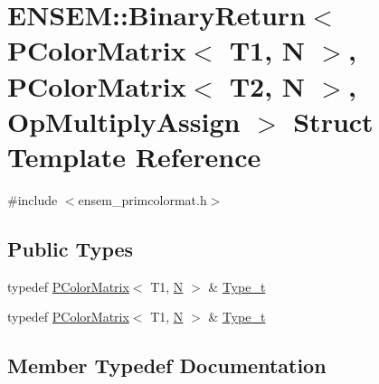 \hypertarget{structENSEM_1_1BinaryReturn_3_01PColorMatrix_3_01T1_00_01N_01_4_00_01PColorMatrix_3_01T2_00_01N_01_4_00_01OpMultiplyAssign_01_4}{}\section{E\+N\+S\+EM\+:\+:Binary\+Return$<$ P\+Color\+Matrix$<$ T1, N $>$, P\+Color\+Matrix$<$ T2, N $>$, Op\+Multiply\+Assign $>$ Struct Template Reference}
\label{structENSEM_1_1BinaryReturn_3_01PColorMatrix_3_01T1_00_01N_01_4_00_01PColorMatrix_3_01T2_00_01N_01_4_00_01OpMultiplyAssign_01_4}


{\ttfamily \#include $<$ensem\+\_\+primcolormat.\+h$>$}

\subsection*{Public Types}
\begin{DoxyCompactItemize}
\item 
typedef \mbox{\hyperlink{classENSEM_1_1PColorMatrix}{P\+Color\+Matrix}}$<$ T1, \mbox{\hyperlink{operator__name__util_8cc_a7722c8ecbb62d99aee7ce68b1752f337}{N}} $>$ \& \mbox{\hyperlink{structENSEM_1_1BinaryReturn_3_01PColorMatrix_3_01T1_00_01N_01_4_00_01PColorMatrix_3_01T2_00_01N_01_4_00_01OpMultiplyAssign_01_4_a4e651c3dec8d84b6018be3b261e51570}{Type\+\_\+t}}
\item 
typedef \mbox{\hyperlink{classENSEM_1_1PColorMatrix}{P\+Color\+Matrix}}$<$ T1, \mbox{\hyperlink{operator__name__util_8cc_a7722c8ecbb62d99aee7ce68b1752f337}{N}} $>$ \& \mbox{\hyperlink{structENSEM_1_1BinaryReturn_3_01PColorMatrix_3_01T1_00_01N_01_4_00_01PColorMatrix_3_01T2_00_01N_01_4_00_01OpMultiplyAssign_01_4_a4e651c3dec8d84b6018be3b261e51570}{Type\+\_\+t}}
\end{DoxyCompactItemize}


\subsection{Member Typedef Documentation}
\mbox{\label{structENSEM_1_1BinaryReturn_3_01PColorMatrix_3_01T1_00_01N_01_4_00_01PColorMatrix_3_01T2_00_01N_01_4_00_01OpMultiplyAssign_01_4_a4e651c3dec8d84b6018be3b261e51570}} 
